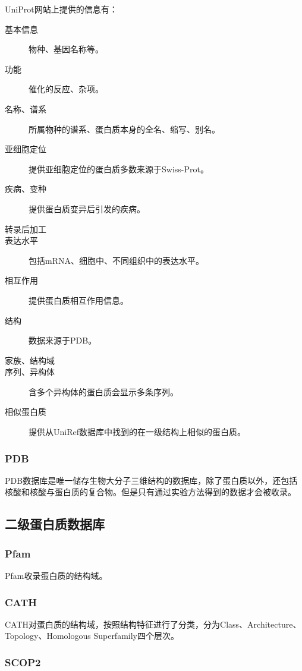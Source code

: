 UniProt网站上提供的信息有：

\begin{description}
	\item [基本信息]物种、基因名称等。
	\item [功能]催化的反应、杂项。
	\item [名称、谱系]所属物种的谱系、蛋白质本身的全名、缩写、别名。
	\item [亚细胞定位] 提供亚细胞定位的蛋白质多数来源于Swiss-Prot。
	\item[疾病、变种] 提供蛋白质变异后引发的疾病。
	\item[转录后加工]
	\item[表达水平] 包括mRNA、细胞中、不同组织中的表达水平。
	\item[相互作用] 提供蛋白质相互作用信息。
	\item[结构] 数据来源于PDB。
	\item[家族、结构域]
	\item[序列、异构体] 含多个异构体的蛋白质会显示多条序列。
	\item[相似蛋白质] 提供从UniRef数据库中找到的在一级结构上相似的蛋白质。
\end{description}

\subsubsection{PDB}

PDB数据库是唯一储存生物大分子三维结构的数据库，除了蛋白质以外，还包括核酸和核酸与蛋白质的复合物。但是只有通过实验方法得到的数据才会被收录。

\subsection{二级蛋白质数据库}

\subsubsection{Pfam}

Pfam收录蛋白质的结构域。

\subsubsection{CATH}

CATH对蛋白质的结构域，按照结构特征进行了分类，分为Class、Architecture、Topology、Homologous Superfamily四个层次。

\subsubsection{SCOP2}

